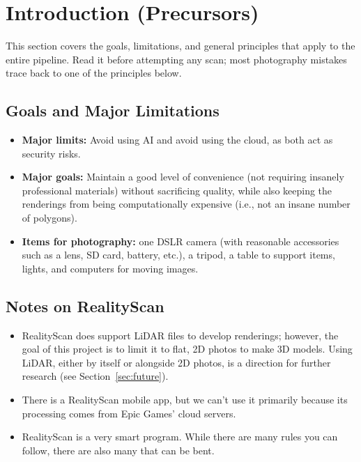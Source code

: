\documentclass[11pt]{article}
\begin{document}
\newpage

\tableofcontents

\newpage

\section{Introduction (Precursors)}
This section covers the goals, limitations, and general principles that apply to the entire pipeline. Read it before attempting any scan; most photography mistakes trace back to one of the principles below.

\subsection{Goals and Major Limitations}
\begin{itemize}[leftmargin=1.4em]
  \item \textbf{Major limits:} Avoid using AI and avoid using the cloud, as both act as security risks.
  \item \textbf{Major goals:} Maintain a good level of convenience (not requiring insanely professional materials) without sacrificing quality, while also keeping the renderings from being computationally expensive (i.e., not an insane number of polygons).
  \item \textbf{Items for photography:} one DSLR camera (with reasonable accessories such as a lens, SD card, battery, etc.), a tripod, a table to support items, lights, and computers for moving images.
\end{itemize}

\subsection{Notes on RealityScan}
\begin{itemize}[leftmargin=1.4em]
  \item RealityScan does support LiDAR files to develop renderings; however, the goal of this project is to limit it to flat, 2D photos to make 3D models. Using LiDAR, either by itself or alongside 2D photos, is a direction for further research (see Section~\ref{sec:future}).
  \item There is a RealityScan mobile app, but we can't use it primarily because its processing comes from Epic Games' cloud servers.
  \item RealityScan is a very smart program. While there are many rules you can follow, there are also many that can be bent.
\end{itemize}
\end{document}
